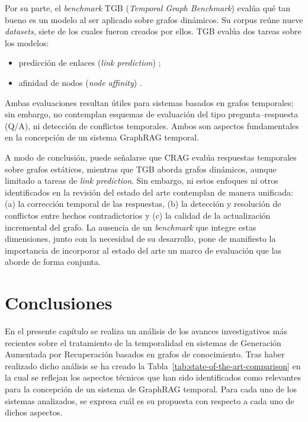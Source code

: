 Por su parte, el \emph{benchmark} TGB (\emph{Temporal Graph Benchmark}) \cite{tgb2023} evalúa qué tan bueno es un modelo al ser aplicado sobre grafos dinámicos. Su corpus reúne nueve \emph{datasets}, siete de los cuales fueron creados por ellos. TGB evalúa dos tareas sobre los modelos:
\begin{itemize}
    \item predicción de enlaces (\emph{link prediction}) \cite{libennowell2007link};
    \item afinidad de nodos (\emph{node affinity}) \cite{tgb2023}.
\end{itemize}
Ambas evaluaciones resultan útiles para sistemas basados en grafos temporales; sin embargo, no contemplan esquemas de evaluación del tipo pregunta--respuesta (Q/A), ni detección de conflictos temporales. Ambos son aspectos fundamentales en la concepción de un sistema GraphRAG temporal.

A modo de conclusión, puede señalarse que CRAG evalúa respuestas temporales sobre grafos estáticos, mientras que TGB aborda grafos dinámicos, aunque limitado a tareas de \emph{link prediction}. Sin embargo, ni estos enfoques ni otros identificados en la revisión del estado del arte contemplan de manera unificada: (a) la corrección temporal de las respuestas, (b) la detección y resolución de conflictos entre hechos contradictorios y (c) la calidad de la actualización incremental del grafo. La ausencia de un \emph{benchmark} que integre estas dimensiones, junto con la necesidad de su desarrollo, pone de manifiesto la importancia de incorporar al estado del arte un marco de evaluación que las aborde de forma conjunta.

\section{Conclusiones}\label{sec:soa-conclusions}

En el presente capítulo se realiza un análisis de los avances investigativos más recientes sobre el tratamiento de la temporalidad en sistemas de Generación Aumentada por Recuperación basados en grafos de conocimiento. Tras haber realizado dicho análisis se ha creado la Tabla~\ref{tab:state-of-the-art-comparison} en la cual se reflejan los aspectos técnicos que han sido identificados como relevantes para la concepción de un sistema de GraphRAG temporal. Para cada uno de los sistemas analizados, se expresa cuál es su propuesta con respecto a cada uno de dichos aspectos.

